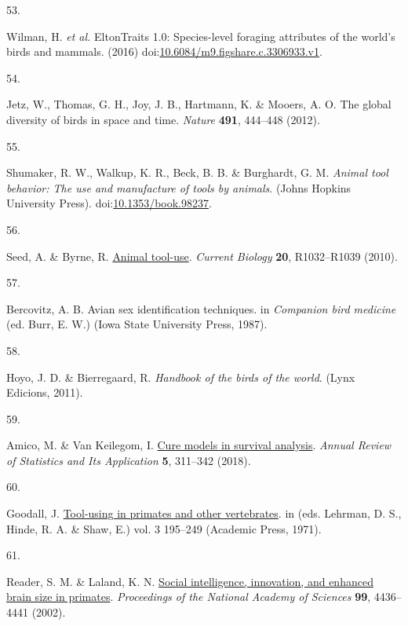 \documentclass[
  man,floatsintext]{apa6}
\newlength{\cslhangindent}
\newlength{\csllabelwidth}
\newlength{\cslentryspacingunit} %
\newenvironment{CSLReferences}[2] %
 {%
  \setlength{\parindent}{0pt}
  \ifodd #1
  \let\oldpar\par
  \def\par{\hangindent=\cslhangindent\oldpar}
  \fi
  \setlength{\parskip}{#2\cslentryspacingunit}
 }%
 {}
\newcommand{\CSLLeftMargin}[1]{\parbox[t]{\csllabelwidth}{#1}}
\newcommand{\CSLRightInline}[1]{\parbox[t]{\linewidth - \csllabelwidth}{#1}\break}
\begin{document}
\begin{CSLReferences}{0}{0}
\leavevmode{}%
\CSLLeftMargin{53. }%
\CSLRightInline{Wilman, H. \emph{et al.} EltonTraits 1.0: Species-level foraging attributes of the world's birds and mammals. (2016) doi:\href{https://doi.org/10.6084/m9.figshare.c.3306933.v1}{10.6084/m9.figshare.c.3306933.v1}.}

\leavevmode{}%
\CSLLeftMargin{54. }%
\CSLRightInline{Jetz, W., Thomas, G. H., Joy, J. B., Hartmann, K. \& Mooers, A. O. The global diversity of birds in space and time. \emph{Nature} \textbf{491}, 444--448 (2012).}

\leavevmode{}%
\CSLLeftMargin{55. }%
\CSLRightInline{Shumaker, R. W., Walkup, K. R., Beck, B. B. \& Burghardt, G. M. \emph{Animal tool behavior: The use and manufacture of tools by animals}. (Johns Hopkins University Press). doi:\href{https://doi.org/10.1353/book.98237}{10.1353/book.98237}.}

\leavevmode{}%
\CSLLeftMargin{56. }%
\CSLRightInline{Seed, A. \& Byrne, R. \href{https://doi.org/10.1016/j.cub.2010.09.042}{Animal tool-use}. \emph{Current Biology} \textbf{20}, R1032--R1039 (2010).}

\leavevmode{}%
\CSLLeftMargin{57. }%
\CSLRightInline{Bercovitz, A. B. Avian sex identification techniques. in \emph{Companion bird medicine} (ed. Burr, E. W.) (Iowa State University Press, 1987).}

\leavevmode{}%
\CSLLeftMargin{58. }%
\CSLRightInline{Hoyo, J. D. \& Bierregaard, R. \emph{Handbook of the birds of the world}. (Lynx Edicions, 2011).}

\leavevmode{}%
\CSLLeftMargin{59. }%
\CSLRightInline{Amico, M. \& Van Keilegom, I. \href{https://doi.org/10.1146/annurev-statistics-031017-100101}{Cure models in survival analysis}. \emph{Annual Review of Statistics and Its Application} \textbf{5}, 311--342 (2018).}

\leavevmode{}%
\CSLLeftMargin{60. }%
\CSLRightInline{Goodall, J. \href{https://doi.org/10.1016/S0065-3454(08)60157-6}{Tool-using in primates and other vertebrates}. in (eds. Lehrman, D. S., Hinde, R. A. \& Shaw, E.) vol. 3 195--249 (Academic Press, 1971).}

\leavevmode{}%
\CSLLeftMargin{61. }%
\CSLRightInline{Reader, S. M. \& Laland, K. N. \href{https://doi.org/10.1073/pnas.062041299}{Social intelligence, innovation, and enhanced brain size in primates}. \emph{Proceedings of the National Academy of Sciences} \textbf{99}, 4436--4441 (2002).}


\end{CSLReferences}
\end{document}
